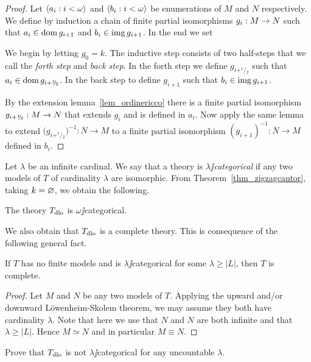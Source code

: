 \documentclass[creche.tex]{subfiles}
\begin{document}
\begin{proof}
Let $\langle a_i:i<\omega\rangle$ and $\langle b_i:i<\omega\rangle$ be enumerations of $M$ and $N$ respectively.
We define by induction a chain of finite partial isomorphisms $g_i:M\rightarrow N$ such that $a_i\in\mathop{\rm dom} g_{i+1}$ and $b_i\in\mathop{\rm img} g_{i+1}$.
In the end we set


We begin by letting $g_0=k$.
The inductive step consists of two half-steps that we call the \textit{forth step} and \textit{back step}.
In the forth step we define $g_{i+^1\!\!/\!_2}$ such that $a_i\in\mathop{\rm dom} g_{i+^1\!\!/\!_2}$.
In the back step to define $g_{i+1}$ such that $b_i\in\mathop{\rm img} g_{i+1}$.

By the extension lemma~\ref{lem_ordinericco} there is a finite partial isomorphism $g_{i+^1\!\!/\!_2}:M\rightarrow N$ that extends $g_i$ and is defined in $a_i$.
Now apply the same lemma to extend $\big(g_{i+^1\!\!/\!_2}\big)^{-1}:N\to M$ to a finite partial isomorphism $(g_{i+1})^{-1}:N\to M$ defined in $b_i$.
\end{proof}

Let $\lambda$ be an infinite cardinal.
We say that a theory is \emph{$\lambda\jj$categorical\/} if any two models of $T$ of cardinality $\lambda$ are isomorphic.
From Theorem~\ref{thm_zigzagcantor}, taking $k=\varnothing$, we obtain the following.

\begin{corollary}
The theory $T_{\rm dlo}$ is $\omega\jj$categorical.\QED
\end{corollary}

We also obtain that $T_{\rm dlo}$ is a complete theory.
This is consequence of the following general fact.

\begin{proposition}\label{thm_categorical->complete}
If $T$ has no finite models and is $\lambda\jj$categorical for some $\lambda\ge|L|$, then $T$ is complete.
\end{proposition}

\begin{proof}
Let $M$ and $N$ be any two models of $T$.
Applying the upward and/or downward L\"owenheim-Skolem theorem, we may assume they both have cardinality $\lambda$.
Note that here we use that $N$ and $N$ are both infinite and that $\lambda\ge|L|$.
Hence $M\simeq N$ and in particular $M\equiv N$.
\end{proof}

\begin{exercise}
Prove that $T_{\rm dlo}$ is not $\lambda\jj$categorical for any uncountable $\lambda$.\QED
\end{exercise}
\end{document}
